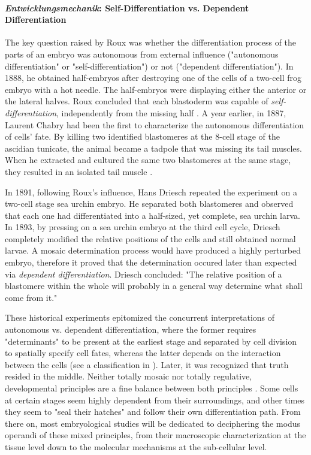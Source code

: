 \paragraph{\textit{Entwicklungsmechanik}: Self-Differentiation vs. Dependent Differentiation}


The key question raised by Roux was whether the differentiation process of the parts of an embryo was autonomous from external influence ("autonomous differentiation" or "self-differentiation") or not ("dependent differentiation"). In 1888, he obtained half-embryos after destroying one of the cells of a two-cell frog embryo with a hot needle. The half-embryos were displaying either the anterior or the lateral halves. Roux concluded that each blastoderm was capable of \textit{self-differentiation}, independently from the missing half \cite{Hamburger:1997cm}. A year earlier, in 1887, Laurent Chabry had been the first to characterize the autonomous differentiation of cells' fate. By killing two identified blastomeres at the 8-cell stage of the ascidian tunicate, the animal became a tadpole that was missing its tail muscles. When he extracted and cultured the same two blastomeres at the same stage, they resulted in an isolated tail muscle \cite{Lawrence:2006ke}.

In 1891, following Roux's influence, Hans Driesch repeated the experiment on a two-cell stage sea urchin embryo. He separated both blastomeres and observed that each one had differentiated into a half-sized, yet complete, sea urchin larva. In 1893, by pressing on a sea urchin embryo at the third cell cycle, Driesch completely modified the relative positions of the cells and still obtained normal larvae. A mosaic determination process would have produced a highly perturbed embryo, therefore it proved that the determination occured later than expected via \textit{dependent differentiation}. Driesch concluded: "The relative position of a blastomere within the whole will probably in a general way determine what shall come from it."

These historical experiments epitomized the concurrent interpretations of autonomous vs. dependent differentiation, where the former requires "determinants" to be present at the earliest stage and separated by cell division to spatially specify cell fates, whereas the latter depends on the interaction between the cells (see a classification in \cite{Davidson:1991uu}). Later, it was recognized that truth resided in the middle. Neither totally mosaic nor totally regulative, developmental principles are a fine balance between both principles \cite{Lawrence:2006ke}. Some cells at certain stages seem highly dependent from their surroundings, and other times they seem to "seal their hatches" and follow their own differentiation path. From there on, most embryological studies will be dedicated to deciphering the modus operandi of these mixed principles, from their macroscopic characterization at the tissue level down to the molecular mechanisms at the sub-cellular level.

